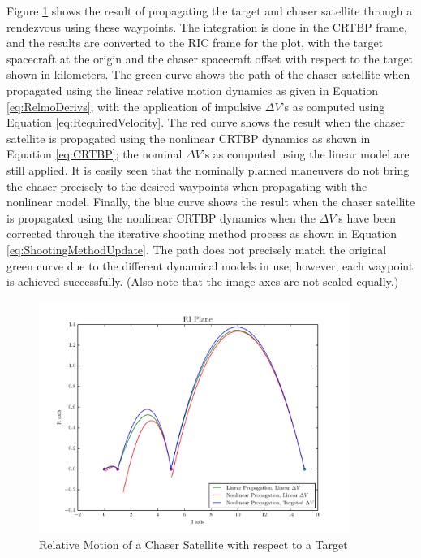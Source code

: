 \documentclass[a4paper]{article}
\begin{document}
Figure \ref{fig:RIC_1} shows the result of propagating the target and chaser satellite through a rendezvous using these waypoints.  The integration is done in the CRTBP frame, and the results are converted to the RIC frame for the plot, with the target spacecraft at the origin and the chaser spacecraft offset with respect to the target shown in kilometers.  The green curve shows the path of the chaser satellite when propagated using the linear relative motion dynamics as given in Equation \ref{eq:RelmoDerivs}, with the application of impulsive \(\Delta V\)'s as computed using Equation \ref{eq:RequiredVelocity}.  The red curve shows the result when the chaser satellite is propagated using the nonlinear CRTBP dynamics as shown in Equation \ref{eq:CRTBP}; the nominal \(\Delta V\)'s as computed using the linear model are still applied.  It is easily seen that the nominally planned maneuvers do not bring the chaser precisely to the desired waypoints when propagating with the nonlinear model.  Finally, the blue curve shows the result when the chaser satellite is propagated using the nonlinear CRTBP dynamics when the \(\Delta V\)'s have been corrected through the iterative shooting method process as shown in Equation \ref{eq:ShootingMethodUpdate}.  The path does not precisely match the original green curve due to the different dynamical models in use; however, each waypoint is achieved successfully.  (Also note that the image axes are not scaled equally.)

\begin{figure}[h] \label{fig:RIC_1}
	\begin{center}
		\includegraphics[width=0.9\textwidth]{RIC_1}
		\caption{Relative Motion of a Chaser Satellite with respect to a Target}
	\end{center}
\end{figure}
\end{document}
